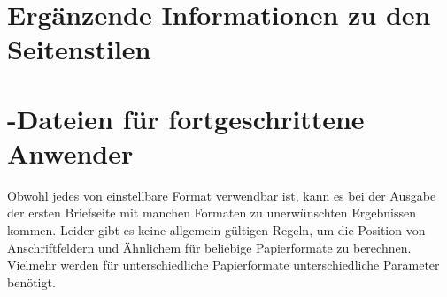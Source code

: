 \section{Ergänzende Informationen zu den Seitenstilen}
\BeginIndexGroup
{}

%
\EndIndexGroup

\section{-Dateien für fortgeschrittene Anwender}
\BeginIndexGroup
{}

\BeginIndexGroup%
%
Obwohl jedes von \hyperref[cha:typearea]{}%
 einstellbare Format verwendbar ist, kann es bei der
Ausgabe der ersten Briefseite mit manchen Formaten zu unerwünschten
Ergebnissen kommen. Leider gibt es
keine allgemein gültigen Regeln, um die Position von Anschriftfeldern und
Ähnlichem für beliebige Papierformate zu berechnen. Vielmehr werden für
unterschiedliche Papierformate unterschiedliche Parameter benötigt.%

